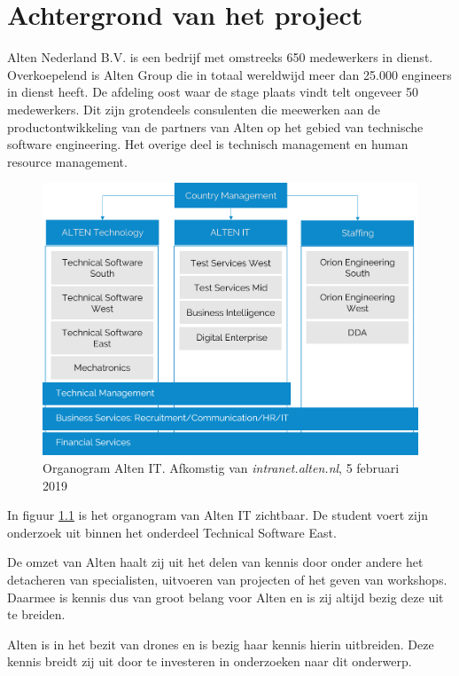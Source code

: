 \documentclass[a4paper, 11pt, oneside]{report}
\begin{document}
\chapter{Achtergrond van het project}
\label{chapter:achtergrond}
Alten Nederland B.V. is een bedrijf met omstreeks 650 medewerkers in dienst. 
Overkoepelend is Alten Group die in totaal wereldwijd meer dan 25.000 engineers in dienst heeft.
De afdeling oost waar de stage plaats vindt telt ongeveer 50 medewerkers. 
Dit zijn grotendeels consulenten die meewerken aan de productontwikkeling van de partners van Alten op het gebied van technische software engineering.
Het overige deel is technisch management en human resource management.
\begin{figure}[H]
	\begin{center}\includegraphics[scale=0.2]{organogram}\end{center}
	\caption{Organogram Alten IT. Afkomstig van \textit{intranet.alten.nl}, 5 februari 2019 }
	\label{fig:organogram}
\end{figure}

In figuur \ref{fig:organogram} is het organogram van Alten IT zichtbaar.
De student voert zijn onderzoek uit binnen het onderdeel Technical Software East.

De omzet van Alten haalt zij uit het delen van kennis door onder andere het detacheren van specialisten, uitvoeren van projecten of het geven van workshops.
Daarmee is kennis dus van groot belang voor Alten en is zij altijd bezig deze uit te breiden. 

Alten is in het bezit van drones en is bezig haar kennis hierin uitbreiden.
Deze kennis breidt zij uit door te investeren in onderzoeken naar dit onderwerp.
\end{document}
